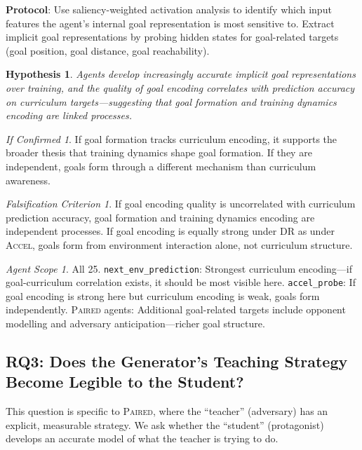 \documentclass[11pt,a4paper]{article}
\newtheorem{hypothesis}{Hypothesis}[subsection]
\theoremstyle{remark}
\newtheorem*{falsification}{Falsification Criterion}
\newtheorem*{implication}{If Confirmed}
\newtheorem*{agentscope}{Agent Scope}
\newcommand{\paired}{\textsc{Paired}}
\newcommand{\accel}{\textsc{Accel}}
\newcommand{\dr}{\textsc{DR}}
\begin{document}
\textbf{Protocol}: Use saliency-weighted activation analysis to identify which input features the agent's internal goal representation is most sensitive to. Extract implicit goal representations by probing hidden states for goal-related targets (goal position, goal distance, goal reachability).

\begin{hypothesis}
Agents develop increasingly accurate implicit goal representations over training, and the quality of goal encoding correlates with prediction accuracy on curriculum targets---suggesting that goal formation and training dynamics encoding are linked processes.
\end{hypothesis}

\begin{implication}
If goal formation tracks curriculum encoding, it supports the broader thesis that training dynamics shape goal formation. If they are independent, goals form through a different mechanism than curriculum awareness.
\end{implication}

\begin{falsification}
If goal encoding quality is uncorrelated with curriculum prediction accuracy, goal formation and training dynamics encoding are independent processes. If goal encoding is equally strong under \dr{} as under \accel{}, goals form from environment interaction alone, not curriculum structure.
\end{falsification}

\begin{agentscope}
All 25. \texttt{next\_env\_prediction}: Strongest curriculum encoding---if goal-curriculum correlation exists, it should be most visible here. \texttt{accel\_probe}: If goal encoding is strong here but curriculum encoding is weak, goals form independently. \paired{} agents: Additional goal-related targets include opponent modelling and adversary anticipation---richer goal structure.
\end{agentscope}

\subsection{RQ3: Does the Generator's Teaching Strategy Become Legible to the Student?}
\label{sec:rq3}

This question is specific to \paired{}, where the ``teacher'' (adversary) has an explicit, measurable strategy. We ask whether the ``student'' (protagonist) develops an accurate model of what the teacher is trying to do.
\end{document}
